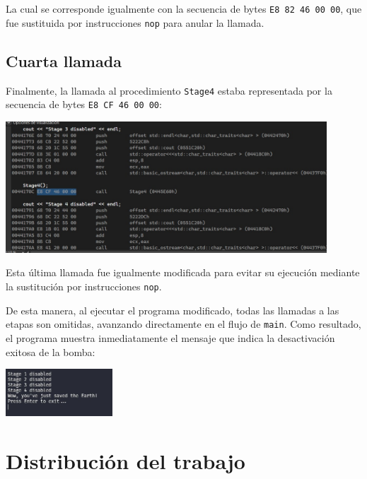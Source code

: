 \documentclass[11pt,a4paper]{article}
\begin{document}
\noindent La cual se corresponde igualmente con la secuencia de bytes \texttt{E8 82 46 00 00}, que fue sustituida por instrucciones \texttt{nop} para anular la llamada.

\vspace{3ex}

\subsection{Cuarta llamada}
\noindent Finalmente, la llamada al procedimiento \texttt{Stage4} estaba representada por la secuencia de bytes \texttt{E8 CF 46 00 00}:
\begin{center}
\includegraphics[width=0.9\textwidth]{4-7.png}
\end{center}
\vspace{1ex}

\noindent Esta última llamada fue igualmente modificada para evitar su ejecución mediante la sustitución por instrucciones \texttt{nop}.

\vspace{2ex}

\noindent De esta manera, al ejecutar el programa modificado, todas las llamadas a las etapas son omitidas, avanzando directamente en el flujo de \texttt{main}. Como resultado, el programa muestra inmediatamente el mensaje que indica la desactivación exitosa de la bomba:

\begin{center}
\includegraphics[width=0.3\textwidth]{4-8.png}
\end{center}
\vspace{3ex}



\section{Distribución del trabajo}
\end{document}
